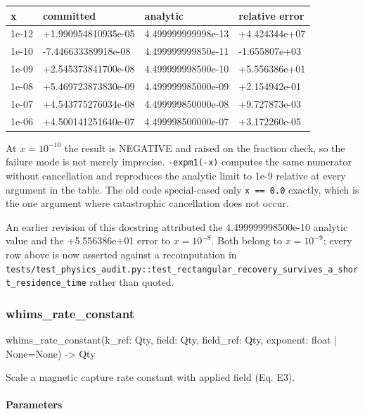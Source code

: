 \documentclass[10pt,a4paper,twoside]{report}
\begin{document}
\begin{center}
\footnotesize
\begin{tabular}{@{}lllp{}@{}}
\toprule
x & committed & analytic & relative error \\
\midrule
1e-12 & +1.990954810935e-05 & 4.499999999998e-13 & +4.424344e+07 \\
1e-10 & -7.446633389918e-08 & 4.499999999850e-11 & -1.655807e+03 \\
1e-09 & +2.545373841700e-08 & 4.499999998500e-10 & +5.556386e+01 \\
1e-08 & +5.469723873830e-09 & 4.499999985000e-09 & +2.154942e-01 \\
1e-07 & +4.543775276034e-08 & 4.499999850000e-08 & +9.727873e-03 \\
1e-06 & +4.500141251640e-07 & 4.499998500000e-07 & +3.172260e-05 \\
\bottomrule
\end{tabular}
\end{center}

At $x = 10^{-10}$ the result is NEGATIVE and raised on the fraction check, so the failure mode is not merely imprecise. \texttt{-expm1(-x)} computes the same numerator without cancellation and reproduces the analytic limit to 1e-9 relative at every argument in the table. The old code special-cased only \texttt{x == 0.0} exactly, which is the one argument where catastrophic cancellation does not occur.

An earlier revision of this docstring attributed the 4.499999998500e-10 analytic value and the +5.556386e+01 error to $x = 10^{-8}$. Both belong to $x = 10^{-9}$; every row above is now asserted against a recomputation in \texttt{tests/test\_physics\_audit.py::test\_rectangular\_recovery\_survives\_a\_short\_residence\_time} rather than quoted.

\subsubsection*{whims\_rate\_constant}

\begin{verbatimsmall}
whims_rate_constant(k_ref: Qty, field: Qty, field_ref: Qty, exponent: float | None=None) -> Qty
\end{verbatimsmall}

Scale a magnetic capture rate constant with applied field (Eq. E3).

\paragraph*{Parameters}
\end{document}
